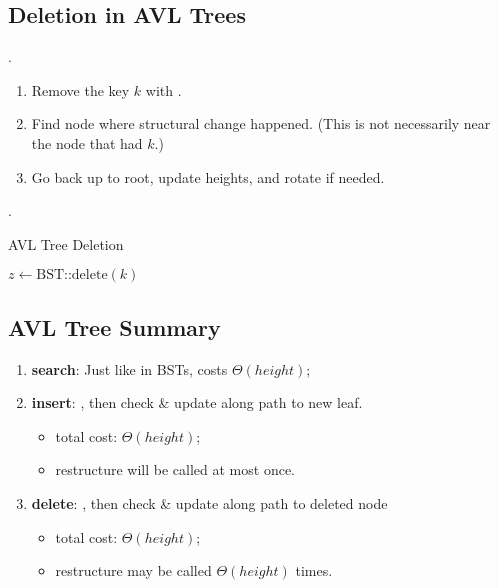 \documentclass{article}
\begin{document}
\subsection{Deletion in AVL Trees} 

\begin{algo}[].
    \begin{enumerate}
        \item Remove the key $k$ with . 
        \item Find node where structural change happened. (This is not necessarily near the node that had $k$.) 
        \item Go back up to root, update heights, and rotate if needed. 
    \end{enumerate}
\end{algo}

\begin{codes}[].
    \begin{algorithm}[H]
        \caption{AVL Tree Deletion}
        \DontPrintSemicolon
        
        $z \leftarrow \text{BST::delete}(k)$ 
    \end{algorithm}
\end{codes}

\subsection{AVL Tree Summary}

\begin{enumerate}
    \item \textbf{search}: Just like in BSTs, costs $\Theta(height)$; 
    \item \textbf{insert}: , then check \& update along path to new leaf. \begin{itemize}
        \item total cost: $\Theta(height)$; 
        \item restructure will be called at most once.
    \end{itemize}
    \item \textbf{delete}: , then check \& update along path to deleted node \begin{itemize}
        \item total cost: $\Theta(height)$; 
        \item restructure may be called $\Theta(height)$ times. 
    \end{itemize}
\end{enumerate} 
\end{document}
